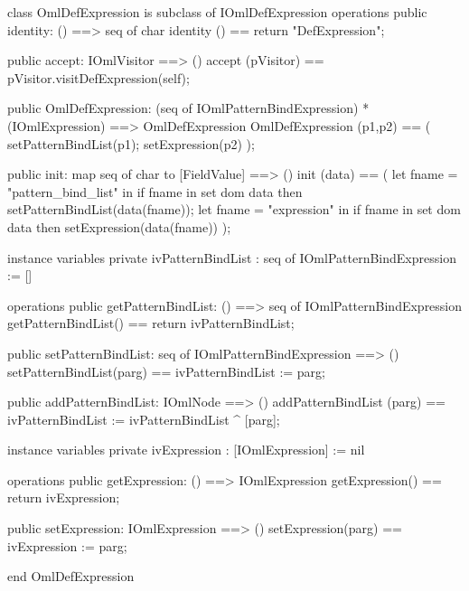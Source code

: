 \begin{vdm_al}
class OmlDefExpression is subclass of IOmlDefExpression
operations
  public identity: () ==> seq of char
  identity () == return "DefExpression";

  public accept: IOmlVisitor ==> ()
  accept (pVisitor) == pVisitor.visitDefExpression(self);

  public OmlDefExpression:
      (seq of IOmlPatternBindExpression) *
      (IOmlExpression) ==> OmlDefExpression
  OmlDefExpression (p1,p2) == 
   ( setPatternBindList(p1);
     setExpression(p2) );

  public init: map seq of char to [FieldValue] ==> ()
  init (data) ==
    ( let fname = "pattern_bind_list" in
        if fname in set dom data
        then setPatternBindList(data(fname));
      let fname = "expression" in
        if fname in set dom data
        then setExpression(data(fname)) );

instance variables
  private ivPatternBindList : seq of IOmlPatternBindExpression := []

operations
  public getPatternBindList: () ==> seq of IOmlPatternBindExpression
  getPatternBindList() == return ivPatternBindList;

  public setPatternBindList: seq of IOmlPatternBindExpression ==> ()
  setPatternBindList(parg) == ivPatternBindList := parg;

  public addPatternBindList: IOmlNode ==> ()
  addPatternBindList (parg) == ivPatternBindList := ivPatternBindList ^ [parg];

instance variables
  private ivExpression : [IOmlExpression] := nil

operations
  public getExpression: () ==> IOmlExpression
  getExpression() == return ivExpression;

  public setExpression: IOmlExpression ==> ()
  setExpression(parg) == ivExpression := parg;

end OmlDefExpression
\end{vdm_al}

